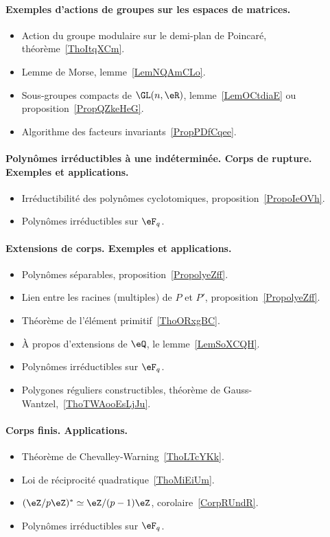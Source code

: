 \paragraph{Exemples d'actions de groupes sur les espaces de matrices.}
\begin{itemize}
	\item Action du groupe modulaire sur le demi-plan de Poincaré, théorème~\ref{ThoItqXCm}.
	\item Lemme de Morse, lemme~\ref{LemNQAmCLo}.
	\item Sous-groupes compacts de \( \GL(n,\eR)\), lemme~\ref{LemOCtdiaE} ou proposition~\ref{PropQZkeHeG}.
	\item Algorithme des facteurs invariants~\ref{PropPDfCqee}.
\end{itemize}
\paragraph{Polynômes irréductibles à une indéterminée. Corps de rupture. Exemples et applications.}
\begin{itemize}
	\item Irréductibilité des polynômes cyclotomiques, proposition~\ref{PropoIeOVh}.
	\item Polynômes irréductibles sur \( \eF_q\).
\end{itemize}
\paragraph{Extensions de corps. Exemples et applications.}
\begin{itemize}
	\item Polynômes séparables, proposition~\ref{PropolyeZff}.
	\item Lien entre les racines (multiples) de \( P\) et \( P'\), proposition~\ref{PropolyeZff}.
	\item Théorème de l'élément primitif~\ref{ThoORxgBC}.
	\item À propos d'extensions de \( \eQ\), le lemme~\ref{LemSoXCQH}.
	\item Polynômes irréductibles sur \( \eF_q\).
	\item Polygones réguliers constructibles, théorème de Gauss-Wantzel,~\ref{ThoTWAooEsLjJu}.
\end{itemize}
\paragraph{Corps finis. Applications.}
\begin{itemize}
	\item Théorème de Chevalley-Warning~\ref{ThoLTcYKk}.
	\item Loi de réciprocité quadratique~\ref{ThoMiEiUm}.
	\item \( (\eZ/p\eZ)^*\simeq \eZ/(p-1)\eZ\), corolaire~\ref{CorpRUndR}.
	\item Polynômes irréductibles sur \( \eF_q\).
\end{itemize}

